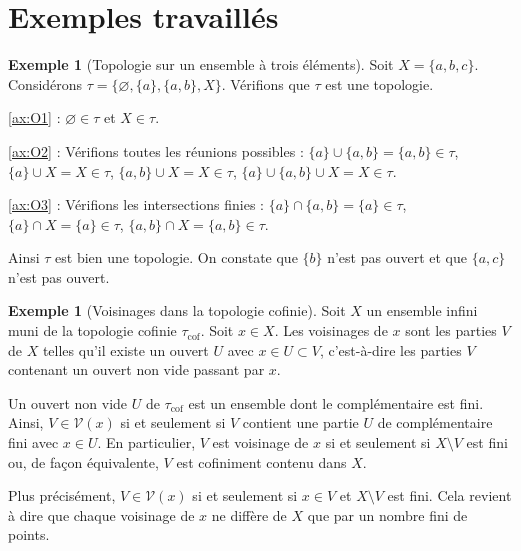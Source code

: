 \documentclass[12pt,a4paper,openany]{book}
\theoremstyle{definition}
\theoremstyle{cours}
\theoremstyle{coursnormal}
\newtheorem{exemple}[theoreme]{Exemple}
\newcommand{\Vois}[1]{\mathcal{V}(#1)}
\begin{document}
\section{Exemples travaillés}
\label{sec:exemples-travailles-chap1}

\begin{exemple}[Topologie sur un ensemble à trois éléments]\label{ex:topo-trois-elements}
  Soit $X = \{a,b,c\}$. Considérons $\tau = \{\varnothing, \{a\}, \{a,b\}, X\}$. Vérifions que $\tau$ est une topologie.

  \ref{ax:O1} : $\varnothing \in \tau$ et $X \in \tau$. \checkmark

  \ref{ax:O2} : Vérifions toutes les réunions possibles :
  $\{a\} \cup \{a,b\} = \{a,b\} \in \tau$,
  $\{a\} \cup X = X \in \tau$,
  $\{a,b\} \cup X = X \in \tau$,
  $\{a\} \cup \{a,b\} \cup X = X \in \tau$. \checkmark

  \ref{ax:O3} : Vérifions les intersections finies :
  $\{a\} \cap \{a,b\} = \{a\} \in \tau$,
  $\{a\} \cap X = \{a\} \in \tau$,
  $\{a,b\} \cap X = \{a,b\} \in \tau$. \checkmark

  Ainsi $\tau$ est bien une topologie. On constate que $\{b\}$ n'est pas ouvert et que $\{a,c\}$ n'est pas ouvert.
\end{exemple}

\begin{exemple}[Voisinages dans la topologie cofinie]\label{ex:voisinages-cofinie}
  Soit $X$ un ensemble infini muni de la topologie cofinie $\tau_{\mathrm{cof}}$. Soit $x \in X$. Les voisinages de $x$ sont les parties $V$ de $X$ telles qu'il existe un ouvert $U$ avec $x \in U \subset V$, c'est-à-dire les parties $V$ contenant un ouvert non vide passant par $x$.

  Un ouvert non vide $U$ de $\tau_{\mathrm{cof}}$ est un ensemble dont le complémentaire est fini. Ainsi, $V \in \Vois{x}$ si et seulement si $V$ contient une partie $U$ de complémentaire fini avec $x \in U$. En particulier, $V$ est voisinage de $x$ si et seulement si $X \setminus V$ est fini ou, de façon équivalente, $V$ est cofiniment contenu dans $X$.

  Plus précisément, $V \in \Vois{x}$ si et seulement si $x \in V$ et $X \setminus V$ est fini. Cela revient à dire que chaque voisinage de $x$ ne diffère de $X$ que par un nombre fini de points.
\end{exemple}
\end{document}
